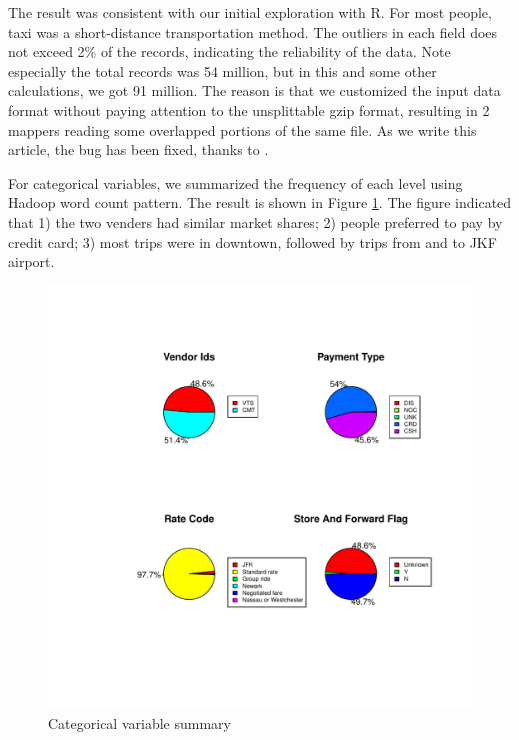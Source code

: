 \documentclass[12pt,a4paper]{article}
\begin{document}
  The result was consistent with our initial exploration with R. For most people, taxi was a short-distance transportation method. The outliers in each field does not exceed 2\% of the records, indicating the reliability of the data. Note especially the total records was 54 million, but in this and some other calculations, we got 91 million. The reason is that we customized the input data format without paying attention to the unsplittable gzip format, resulting in 2 mappers reading some overlapped portions of the same file. As we write this article, the bug has been fixed, thanks to \cite{hadoopsource}.

  For categorical variables, we summarized the frequency of each level using Hadoop word count pattern. The result is shown in Figure \ref{fig:catsum}. The figure indicated that 1) the two venders had similar market shares; 2) people preferred to pay by credit card; 3) most trips were in downtown, followed by trips from and to JKF airport.

  \begin{figure}[h]
    \centering
    \caption{Categorical variable summary}
    \label{fig:catsum}
    \includegraphics[scale=0.6]{plot/factor_summary}
  \end{figure}
\end{document}
